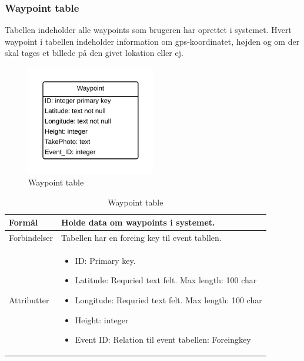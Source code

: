 \subsubsection{Waypoint table}
Tabellen indeholder alle waypoints som brugeren har oprettet i systemet. Hvert waypoint i tabellen indeholder information om gps-koordinatet, højden og om der skal tages et billede på den givet lokation eller ej.
\vspace{-5pt}
\begin{figure}[H]
	\centering
	\includegraphics[width=0.5\textwidth]{Billeder/database/WaypointTable.png}
	\vspace{-5pt}
	\caption{Waypoint table}
	\label{fig:waypoint_table}
\end{figure}

\begin{table}[H]
\begin{tabular}{| p{3cm}| p{11.5cm}|}
\hline

Formål	 							& Holde data om waypoints i systemet.\\\hline
Forbindelser						& Tabellen har en foreing key til event tabllen.\\\hline
Attributter						& \begin{itemize}
												\item ID: Primary key.
												\item Latitude: Requried text felt. Max length: 100 char
												\item Longitude: Requried text felt. Max length: 100 char
												\item Height: integer
												\item Event ID: Relation til event tabellen: Foreingkey
											\end{itemize} \\\hline 
\end{tabular}
\caption{Waypoint table}
\label{tab:waypoint_table}
\end{table}